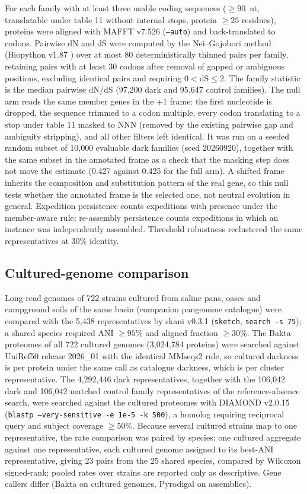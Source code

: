 \documentclass[11pt]{article}
\begin{document}
For each family with at least three usable coding sequences ($\geq 90$~nt, translatable under table
11 without internal stops, protein $\geq 25$ residues), proteins were aligned with MAFFT v7.526
(\texttt{--auto}) \citep{katoh2013mafft} and back-translated to codons. Pairwise dN and dS were computed
by the Nei--Gojobori method \citep{nei1986dnds} (Biopython v1.87 \citep{cock2009biopython}) over at most
80 deterministically thinned pairs per family, retaining pairs with at least 30 codons after removal
of gapped or ambiguous positions, excluding identical pairs and requiring $0 < \mathrm{dS} \leq 2$.
The family statistic is the median pairwise dN/dS (97{,}200 dark and 95{,}647 control families).
The null arm reads the same member genes in the +1 frame: the first nucleotide is dropped, the
sequence trimmed to a codon multiple, every codon translating to a stop under table 11 masked to NNN
(removed by the existing pairwise gap and ambiguity stripping), and all other filters left identical.
It was run on a seeded random subset of 10{,}000 evaluable dark families (seed 20260920), together
with the same subset in the annotated frame as a check that the masking step does not move the
estimate (0.427 against 0.425 for the full arm). A shifted frame inherits the composition and
substitution pattern of the real gene, so this null tests whether the annotated frame is the selected
one, not neutral evolution in general. Expedition persistence counts
expeditions with presence under the member-aware rule; re-assembly persistence counts expeditions in
which an instance was independently assembled. Threshold robustness reclustered the same
representatives at 30\% identity.

\subsection*{Cultured-genome comparison}
Long-read genomes of 722 strains cultured from saline pans, oases and campground soils of the
same basin (companion pangenome catalogue) were compared with the 5{,}438 representatives by skani
v0.3.1 (\texttt{sketch}, \texttt{search -s 75}); a shared species required ANI $\geq 95\%$ and aligned
fraction $\geq 30\%$. The Bakta proteomes of all 722 cultured genomes (3{,}024{,}784 proteins) were
searched against UniRef50 release 2026\_01 with the identical MMseqs2 rule, so cultured darkness is per protein under
the same call as catalogue darkness, which is per cluster representative. The 4{,}292{,}446 dark
representatives, together with the 106{,}042 dark and 106{,}042 matched control family
representatives of the reference-absence search, were searched against the cultured proteomes with
DIAMOND v2.0.15 (\texttt{blastp --very-sensitive -e 1e-5 -k 500}), a homolog requiring reciprocal
query and subject coverage $\geq 50\%$. Because several cultured strains map to one representative,
the rate comparison was paired by species: one cultured aggregate against one representative, each
cultured genome assigned to its best-ANI representative, giving 23 pairs from the 25 shared species,
compared by Wilcoxon signed-rank; pooled rates over
strains are reported only as descriptive. Gene callers differ (Bakta on cultured genomes, Pyrodigal
on assemblies).
\end{document}
